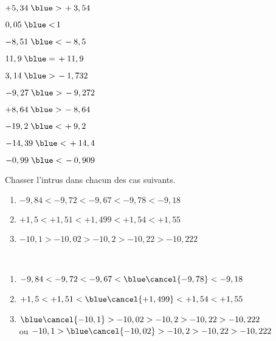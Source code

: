 \begin{colonne*exercice}
\begin{corrige}
   \ \\ [-5mm]
   \begin{colenumerate}{2}
      \item $+5,34 \; {\blue >} \, +3,54$
      \item $0,05 \; {\blue <} \, 1$
      \item $-8,51 \; {\blue <} \, -8,5$
      \item $11,9 \; {\blue =} \, +11,9$
      \item $3,14 \; {\blue >} \, -1,732$
      \item $-9,27 \; {\blue >} \, -9,272$
      \item $+8,64 \; {\blue >} \, -8,64$
      \item $-19,2 \; {\blue <} \, +9,2$
      \item $-14,39 \; {\blue <} \, +14,4$
      \item $-0,99 \; {\blue <} \, -0,909$
   \end{colenumerate}
\end{corrige}

\medskip

\begin{exercice} %
   Chasser l'intrus dans chacun des cas suivants.
   \begin{enumerate}
      \item $-9,84 < -9,72 < -9,67 < -9,78 < -9,18$
      \item $+1,5 < +1,51 < +1,499 < +1,54 < +1,55$
      \item $-10,1 > -10,02 > -10,2 > -10,22 > -10,222$
   \end{enumerate}
\end{exercice}

\begin{corrige}
   \ \\ [-5mm]
   \begin{enumerate}
      \item $-9,84 < -9,72 < -9,67 < {\blue\cancel{-9,78}} < -9,18$ \smallskip
      \item $+1,5 < +1,51 < {\blue\cancel{+1,499}} < +1,54 < +1,55$ \smallskip
      \item ${\blue\cancel{-10,1}} > -10,02 > -10,2 > -10,22 > -10,222$ \\ \smallskip
         ou $-10,1 > {\blue\cancel{-10,02}} > -10,2 > -10,22 > -10,222$ \smallskip
   \end{enumerate}
\end{corrige}


\end{colonne*exercice}
